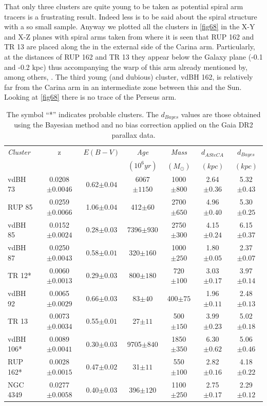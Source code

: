 \documentclass[draft]{aa}
\begin{document}
That only three clusters are quite young to be taken as potential spiral arm
tracers is a frustrating result. Indeed less is to be said about the spiral
structure with a so small sample. Anyway we plotted all the clusters in 
\ref{fig68} in the X-Y and X-Z planes with spiral arms taken from 
\cite{v2005AJ} where it is seen that RUP 162 and TR 13  are placed along the in
the external side of the Carina arm. Particularly, at the distances of RUP 162
and TR 13 they appear below the Galaxy plane (-0.1 and -0.2 kpc) thus
accompanying the warp of this arm already mentioned by, among others, 
\cite{Cersosimo_2009}. The third young (and dubious) cluster, vdBH 162, is
relatively far from the Carina arm in an intermediate zone between this and the
Sun. Looking at \ref{fig68} there is no trace of the Perseus arm. 



\begin{table}[ht]
\centering
\begin{tabular}{lcccccc}
\hline
 \emph{Cluster} & z & $E(B-V)$ & \emph{Age} & \emph{Mass} &
 $d_{ASteCA}$ & $d_{Bayes}$
 \\
& & & $(10^6 yr)$ & $(M_{\odot})$ & $(kpc)$ & $(kpc)$\\
 \hline\hline
 vdBH 73 & 0.0208$\pm0.0046$ & 0.62$\pm0.04$ & 6067$\pm1150$ & 1000$\pm800$ &
 2.64$\pm0.36$ & 5.32$\pm0.43$\\
 RUP 85 & 0.0259$\pm0.0066$ & 1.06$\pm0.04$ & 412$\pm60$ & 2700$\pm650$ &
 4.96$\pm0.40$ & 5.30$\pm0.25$ \\
 vdBH 85 & 0.0152$\pm0.0024$ & 0.28$\pm0.03$ & 7396$\pm930$ & 2750$\pm300$ &
 4.15$\pm0.24$ & 6.15$\pm0.37$ \\
 vdBH 87 & 0.0250$\pm0.0043$ & 0.58$\pm0.01$ & 320$\pm160$ & 1000$\pm250$ &
 1.80$\pm0.05$ & 2.37$\pm0.07$ \\
 TR 12* & 0.0060$\pm0.0013$ & 0.29$\pm0.03$ & 800$\pm180$ & 720$\pm100$ &
 3.03$\pm0.17$ & 3.97$\pm0.14$ \\
 vdBH 92 & 0.0065$\pm0.0029$ & 0.66$\pm0.03$ & 83$\pm40$ & 400$\pm75$ &
 1.96$\pm0.11$ & 2.48$\pm0.13$ \\
 TR 13 & 0.0073$\pm0.0034$ & 0.55$\pm0.01$ & 27$\pm11$ & 500$\pm150$ &
 3.99$\pm0.23$ & 5.02$\pm0.18$ \\
 vdBH 106* & 0.0089$\pm0.0041$ & 0.30$\pm0.03$ & 9705$\pm840$ & 1850$\pm350$ &
 6.30$\pm0.62$ & 5.06$\pm0.46$ \\
 RUP 162* & 0.0028$\pm0.0015$ & 0.47$\pm0.02$ & 31$\pm11$ & 550$\pm100$ &
 2.82$\pm0.16$ & 4.18$\pm0.22$ \\
 NGC 4349 & 0.0277$\pm0.0058$ & 0.40$\pm0.03$ & 396$\pm120$ & 1100$\pm250$ &
 2.75$\pm0.17$ & 2.29$\pm0.12$ \\
 \hline
\end{tabular}
\caption{The symbol ``*'' indicates probable clusters. The $d_{Bayes}$ values
are those obtained using the Bayesian method and no bias correction applied on
the Gaia DR2 parallax data.}
\label{tab:final_tab}
\end{table}
\end{document}
